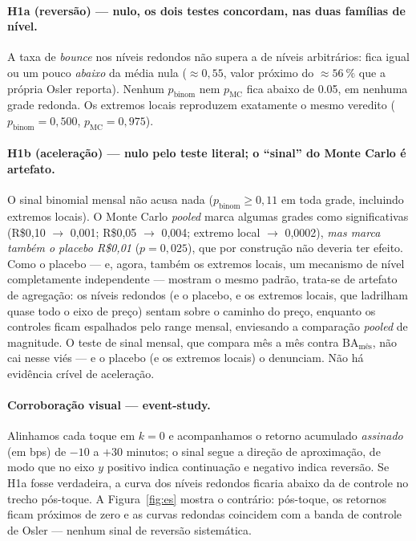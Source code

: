 \documentclass[11pt,a4paper]{article}
\begin{document}
\paragraph{H1a (reversão) --- nulo, os dois testes concordam, nas duas famílias de nível.} A
taxa de \emph{bounce} nos níveis redondos não supera a de níveis arbitrários: fica igual ou um
pouco \emph{abaixo} da média nula ($\approx 0{,}55$, valor próximo do
$\approx\SI{56}{\percent}$ que a própria Osler reporta). Nenhum $p_{\text{binom}}$ nem
$p_{\text{MC}}$ fica abaixo de \num{0.05}, em nenhuma grade redonda. Os extremos locais
reproduzem exatamente o mesmo veredito ($p_{\text{binom}}=0{,}500$, $p_{\text{MC}}=0{,}975$).

\paragraph{H1b (aceleração) --- nulo pelo teste literal; o ``sinal'' do Monte Carlo é
artefato.} O sinal binomial mensal não acusa nada ($p_{\text{binom}} \ge 0{,}11$ em toda
grade, incluindo extremos locais). O Monte Carlo \emph{pooled} marca algumas grades como
significativas (R\$0,10 $\to$ 0,001; R\$0,05 $\to$ 0,004; extremo local $\to$ 0,0002),
\emph{mas marca também o placebo R\$0,01} ($p=0{,}025$), que por construção não deveria ter
efeito. Como o placebo --- e, agora, também os extremos locais, um mecanismo de nível
completamente independente --- mostram o mesmo padrão, trata-se de artefato de agregação: os
níveis redondos (e o placebo, e os extremos locais, que ladrilham quase todo o eixo de preço)
sentam sobre o caminho do preço, enquanto os controles ficam espalhados pelo range mensal,
enviesando a comparação \emph{pooled} de magnitude. O teste de sinal mensal, que compara mês a
mês contra $\mathrm{BA}_{\text{mês}}$, não cai nesse viés --- e o placebo (e os extremos
locais) o denunciam. Não há evidência crível de aceleração.

\paragraph{Corroboração visual --- event-study.} Alinhamos cada toque em $k=0$ e acompanhamos
o retorno acumulado \emph{assinado} (em bps) de $-10$ a $+30$ minutos; o sinal segue a direção
de aproximação, de modo que no eixo $y$ positivo indica continuação e negativo indica
reversão. Se H1a fosse verdadeira, a curva dos níveis redondos ficaria abaixo da de controle
no trecho pós-toque. A Figura~\ref{fig:es} mostra o contrário: pós-toque, os retornos ficam
próximos de zero e as curvas redondas coincidem com a banda de controle de Osler --- nenhum
sinal de reversão sistemática.
\end{document}
